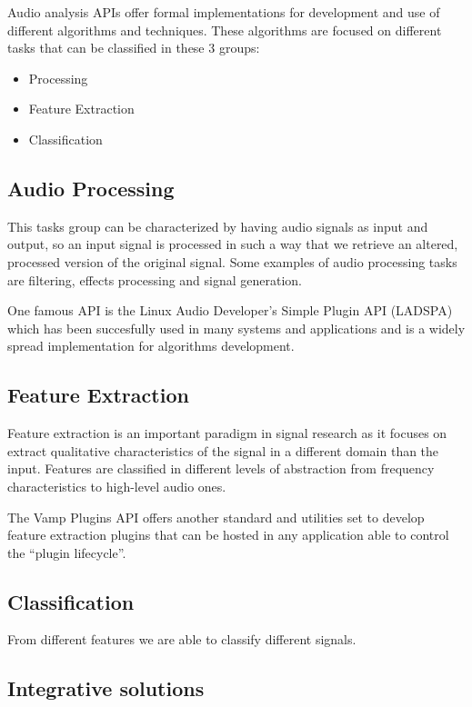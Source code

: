 \documentclass{article}
\begin{document}
Audio analysis  APIs offer formal implementations for development and use of different algorithms and techniques. These algorithms are focused on different tasks that can be classified in these 3 groups:

\begin{itemize}
 \item Processing
 \item Feature Extraction
 \item Classification
\end{itemize}

\subsection{Audio Processing}

This tasks group can be characterized by having audio signals as input and output, so an input signal is processed in such a way that we retrieve an altered, processed version of the original signal. Some examples of audio processing tasks are filtering, effects processing and signal generation.

One famous API is the Linux Audio Developer's Simple Plugin API (LADSPA) which has been succesfully used in many systems and applications and is a widely spread implementation for algorithms development.

\subsection{Feature Extraction}

Feature extraction is an important paradigm in signal research as it focuses on extract qualitative characteristics of the signal in a different domain than the input. Features are classified in different levels of abstraction from frequency characteristics to high-level audio ones.

The Vamp Plugins API offers another standard and utilities set to develop feature extraction plugins that can be hosted in any application able to control the ``plugin lifecycle''.

\subsection{Classification}

From different features we are able to classify different signals. 

\subsection{Integrative solutions}
\end{document}
